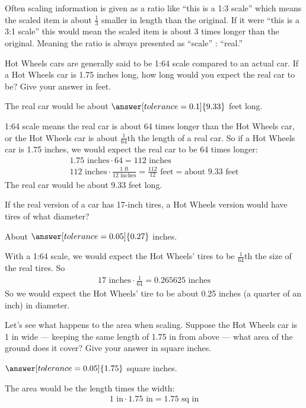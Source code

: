 \documentclass[12pt]{ximera}
\begin{document}
Often scaling information is given as a ratio like ``this is a 1:3 scale'' which means
the scaled item is about $\tfrac{1}{3}$ smaller in length than the original. If it were
``this is a 3:1 scale'' this would mean the scaled item is about 3 times longer than
the original. Meaning the ratio is always presented as ``scale'' : ``real.''

\begin{problem}
Hot Wheels cars are generally said to be 1:64 scale compared to an actual car. If a Hot
Wheels car is 1.75 inches long, how long would you expect the real car to be? Give your
answer in feet.

The real car would be about $\answer[tolerance=0.1]{9.33}$ feet long.

\begin{solution}
1:64 scale means the real car is about 64 times longer than the Hot Wheels car, or the
Hot Wheels car is about $\tfrac{1}{64}$th the length of a real car. So if a Hot Wheels
car is 1.75 inches, we would expect the real car to be 64 times longer:
\begin{gather*}
1.75\text{ inches} \cdot 64 = 112\text{ inches} \\
112\text{ inches} \cdot \frac{1\text{ ft}}{12\text{ inches}} = \frac{112}{12}\text{ feet} = \text{about } 9.33\text{ feet}
\end{gather*}
The real car would be about 9.33 feet long.
\end{solution}
\end{problem}

\begin{problem}
If the real version of a car has 17-inch tires, a Hot Wheels version would have tires of
what diameter?

About $\answer[tolerance=0.05]{0.27}$ inches.

\begin{solution}
With a 1:64 scale, we would expect the Hot Wheels' tires to be $\tfrac{1}{64}$th the
size of the real tires. So
\begin{gather*}
17\text{ inches} \cdot \frac{1}{64} = 0.265625\text{ inches}
\end{gather*}
So we would expect the Hot Wheels' tire to be about 0.25 inches (a quarter of an inch)
in diameter.
\end{solution}
\end{problem}

\begin{problem}
Let's see what happens to the area when scaling. Suppose the Hot Wheels car is 1 in
wide --- keeping the same length of 1.75 in from above --- what area of the ground does
it cover? Give your answer in square inches.

$\answer[tolerance=0.05]{1.75}$ square inches.

\begin{solution}
The area would be the length times the width:
\begin{gather*}
1\text{ in} \cdot 1.75\text{ in} = 1.75\text{ sq in}
\end{gather*}
\end{solution}
\end{problem}
\end{document}
